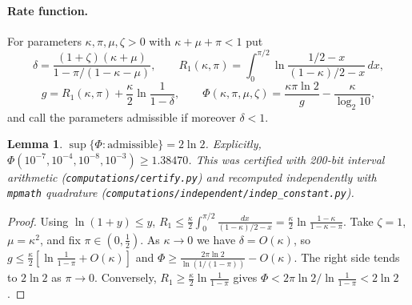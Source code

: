 \documentclass[11pt]{article}
\newtheorem{lemma}[theorem]{Lemma}
\theoremstyle{definition}
\theoremstyle{remark}
\begin{document}
\paragraph{Rate function.} For parameters \(\kappa,\pi,\mu,\zeta>0\) with \(\kappa+\mu+\pi<1\) put
\[
 \delta=\frac{(1+\zeta)(\kappa+\mu)}{1-\pi/(1-\kappa-\mu)},\qquad
 R_1(\kappa,\pi)=\int_0^{\pi/2}\ln\frac{1/2-x}{(1-\kappa)/2-x}\,dx,
\]
\[
 g=R_1(\kappa,\pi)+\frac\kappa2\ln\frac1{1-\delta},\qquad
 \Phi(\kappa,\pi,\mu,\zeta)=\frac{\kappa\pi\ln2}{g}-\frac{\kappa}{\log_2 10},
\]
and call the parameters admissible if moreover \(\delta<1\).

\begin{lemma}\label{lem:sup}
\(\sup\{\Phi:\text{admissible}\}=2\ln 2\). Explicitly, \(\Phi(10^{-7},10^{-4},10^{-8},10^{-3})\ge1.38470\).
This was certified with 200-bit interval arithmetic (\texttt{computations/certify.py}) and recomputed independently
with \texttt{mpmath} quadrature (\texttt{computations/independent/indep\_constant.py}).
\end{lemma}
\begin{proof}
Using \(\ln(1+y)\le y\),
\(R_1\le\frac\kappa2\int_0^{\pi/2}\frac{dx}{(1-\kappa)/2-x}=\frac\kappa2\ln\frac{1-\kappa}{1-\kappa-\pi}\).
Take \(\zeta=1\), \(\mu=\kappa^2\), and fix \(\pi\in(0,\frac12)\). As \(\kappa\to0\) we have
\(\delta=O(\kappa)\), so \(g\le\frac\kappa2[\ln\frac1{1-\pi}+O(\kappa)]\) and
\(\Phi\ge\frac{2\pi\ln 2}{\ln(1/(1-\pi))}-O(\kappa)\). The right side tends to \(2\ln2\) as
\(\pi\to0\). Conversely, \(R_1\ge\frac\kappa2\ln\frac1{1-\pi}\) gives \(\Phi<2\pi\ln2/\ln\frac1{1-\pi}<2\ln 2\).
\end{proof}
\end{document}
